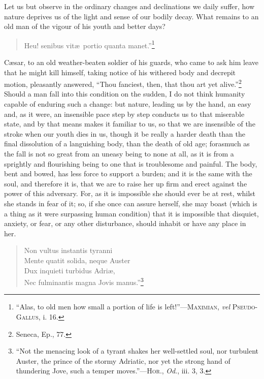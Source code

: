 Let us but observe in the ordinary changes and declinations we daily
suffer, how nature deprives us of the light and sense of our bodily
decay. What remains to an old man of the vigour of his youth and
better days?

\begin{verse}
Heu! senibus vit\ae\ portio quanta manet.''\footnote{``Alas,
to old men how small a portion of life is left!''---\textsc{Maximian},
\textit{vel} \textsc{Pseudo-Gallus}, i. 16.}
\end{verse}

\noindent C\ae sar, to an old weather-beaten soldier of his guards,
who came to ask him leave that he might kill himself, taking 
notice of his withered body and decrepit motion, pleasantly answered,
``Thou fanciest, then, that thou art yet alive.''\footnote{Seneca,
Ep., 77.} Should a man fall into this condition on the sudden, I do
not think humanity capable of enduring such a change: but nature,
leading us by the hand, an easy and, as it were, an insensible pace
step by step conducts us to that miserable state, and by that means
makes it familiar to us, so that we are insensible of the stroke when
our youth dies in us, though it be really a harder death than the
final dissolution of a languishing body, than the death of old age;
forasmuch as the fall is not so great from an uneasy being to none at
all, as it is from a sprightly and flourishing being to one that is
troublesome and painful. The body, bent and bowed, has less force to
support a burden; and it is the same with the soul, and therefore it
is, that we are to raise her up firm and erect against the power of
this adversary. For, as it is impossible she should ever be at rest,
whilst she stands in fear of it; so, if she once can assure herself,
she may boast (which is a thing as it were surpassing human condition)
that it is impossible that disquiet, anxiety, or fear, or any other
disturbance, should inhabit or have any place in her.

\begin{verse}
Non vultus instantis tyranni\\
\vin Mente quatit solida, neque Auster\\
Dux inquieti turbidus Adri\ae,\\
Nec fulminantis magna Jovis manus.''\footnote{``Not the menacing look
of a tyrant shakes her well-settled soul, nor turbulent Auster, the
prince of the stormy Adriatic, nor yet the strong hand of thundering
Jove, such a temper moves.''---\textsc{Hor}., \textit{Od}., iii. 3,
3.}
\end{verse}

